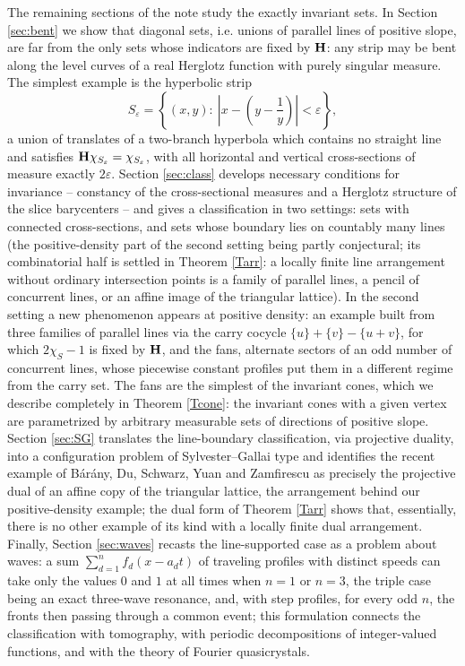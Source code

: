 \documentclass{article}
\def\H{{\bf H}}
\begin{document}
	The remaining sections of the note study the exactly invariant sets. In Section \ref{sec:bent} we show that diagonal sets, i.e. unions of parallel lines of positive slope, are far from the only sets whose indicators are fixed by $\H$: any strip may be bent along the level curves of a real Herglotz function with purely singular measure. The simplest example is the hyperbolic strip
	$$S_\varepsilon=\left\{(x,y):\ \left|x-\left(y-\frac 1y\right)\right|<\varepsilon\right\},$$
	a union of translates of a two-branch hyperbola which contains no straight line and satisfies $\H\chi_{S_\varepsilon}=\chi_{S_\varepsilon}$, with all horizontal and vertical cross-sections of measure exactly $2\varepsilon$. Section \ref{sec:class} develops necessary conditions for invariance -- constancy of the cross-sectional measures and a Herglotz structure of the slice barycenters -- and gives a classification in two settings: sets with connected cross-sections, and sets whose boundary lies on countably many lines (the positive-density part of the second setting being partly conjectural; its combinatorial half is settled in Theorem \ref{Tarr}: a locally finite line arrangement without ordinary intersection points is a family of parallel lines, a pencil of concurrent lines, or an affine image of the triangular lattice). In the second setting a new phenomenon appears at positive density: an example built from three families of parallel lines via the carry cocycle $\{u\}+\{v\}-\{u+v\}$, for which $2\chi_S-1$ is fixed by $\H$, and the fans, alternate sectors of an odd number of concurrent lines, whose piecewise constant profiles put them in a different regime from the carry set. The fans are the simplest of the invariant cones, which we describe completely in Theorem \ref{Tcone}: the invariant cones with a given vertex are parametrized by arbitrary measurable sets of directions of positive slope. Section \ref{sec:SG} translates the line-boundary classification, via projective duality, into a configuration problem of Sylvester--Gallai type and identifies the recent example of B\'ar\'any, Du, Schwarz, Yuan and Zamfirescu \cite{BDSYZ} as precisely the projective dual of an affine copy of the triangular lattice, the arrangement behind our positive-density example; the dual form of Theorem \ref{Tarr} shows that, essentially, there is no other example of its kind with a locally finite dual arrangement. Finally, Section \ref{sec:waves} recasts the line-supported case as a problem about waves: a sum $\sum_{d=1}^nf_d(x-a_dt)$ of traveling profiles with distinct speeds can take only the values $0$ and $1$ at all times when $n=1$ or $n=3$, the triple case being an exact three-wave resonance, and, with step profiles, for every odd $n$, the fronts then passing through a common event; this formulation connects the classification with tomography, with periodic decompositions of integer-valued functions, and with the theory of Fourier quasicrystals.
\end{document}
